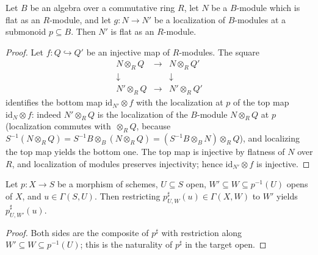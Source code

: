 \begin{lemma}
  \leanok
  \label{lem:flat_localizedModule_algebra}
  Let \(B\) be an algebra over a commutative ring \(R\), let \(N\) be a
  \(B\)-module which is flat as an \(R\)-module, and let
  \(g : N \to N'\) be a localization of \(B\)-modules at a submonoid
  \(p \subseteq B\). Then \(N'\) is flat as an \(R\)-module.
\end{lemma}
\begin{proof}
  \leanok
  Let \(f : Q \hookrightarrow Q'\) be an injective map of \(R\)-modules. The
  square
  \[
    \begin{array}{ccc}
      N \otimes_R Q & \longrightarrow & N \otimes_R Q' \\
      \downarrow & & \downarrow \\
      N' \otimes_R Q & \longrightarrow & N' \otimes_R Q'
    \end{array}
  \]
  identifies the bottom map \(\mathrm{id}_{N'} \otimes f\) with the
  localization at \(p\) of the top map \(\mathrm{id}_N \otimes f\): indeed
  \(N' \otimes_R Q\) is the localization of the \(B\)-module
  \(N \otimes_R Q\) at \(p\) (localization commutes with \(\, \otimes_R Q\),
  because \(S^{-1}(N \otimes_R Q) = S^{-1}B \otimes_B (N \otimes_R Q)
  = (S^{-1}B \otimes_B N) \otimes_R Q\)), and localizing the top map yields
  the bottom one. The top map is injective by flatness of \(N\) over \(R\),
  and localization of modules preserves injectivity; hence
  \(\mathrm{id}_{N'} \otimes f\) is injective.
\end{proof}

\begin{lemma}
  \leanok
  \label{lem:appLE_res_apply}
  Let \(p : X \to S\) be a morphism of schemes, \(U \subseteq S\) open,
  \(W' \subseteq W \subseteq p^{-1}(U)\) opens of \(X\), and
  \(u \in \Gamma(S, U)\). Then restricting
  \(p^\sharp_{U,W}(u) \in \Gamma(X, W)\) to \(W'\) yields
  \(p^\sharp_{U,W'}(u)\).
\end{lemma}
\begin{proof}
  \leanok
  Both sides are the composite of \(p^\sharp\) with restriction along
  \(W' \subseteq W \subseteq p^{-1}(U)\); this is the naturality of
  \(p^\sharp\) in the target open.
\end{proof}


